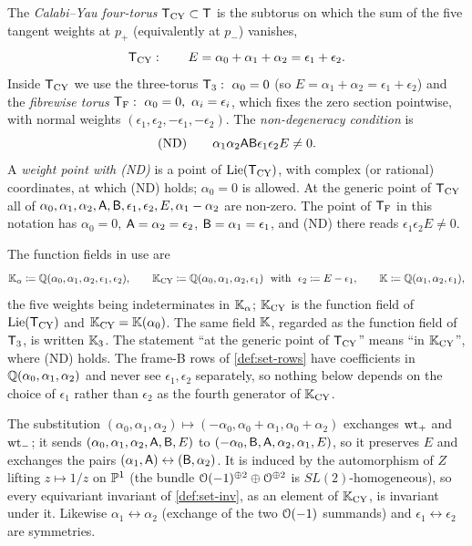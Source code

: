 \begin{defn}
\label{def:set-ND}
The \emph{Calabi--Yau four-torus} $\mathsf{T}_{\mathrm{CY}}\subset\mathsf{T}$ is the subtorus on which the sum of the five tangent weights at $p_+$ (equivalently at $p_-$) vanishes,
\[
\mathsf{T}_{\mathrm{CY}}:\qquad E=\alpha_0+\alpha_1+\alpha_2=\epsilon_1+\epsilon_2 .
\]
Inside $\mathsf{T}_{\mathrm{CY}}$ we use the three-torus $\mathsf{T}_{3}:\ \alpha_0=0$ (so $E=\alpha_1+\alpha_2=\epsilon_1+\epsilon_2$) and the \emph{fibrewise torus} $\TF:\ \alpha_0=0,\ \alpha_i=\epsilon_i$, which fixes the zero section pointwise, with normal weights $(\epsilon_1,\epsilon_2,-\epsilon_1,-\epsilon_2)$. The \emph{non-degeneracy condition} is
\[
\text{(ND)}\qquad \alpha_1\alpha_2\mathsf{A}\mathsf{B}\epsilon_1\epsilon_2E\neq0 .
\]
A \emph{weight point with (ND)} is a point of $\mathrm{Lie}(\mathsf{T}_{\mathrm{CY}})$, with complex (or rational) coordinates, at which (ND) holds; $\alpha_0=0$ is allowed. At the generic point of $\mathsf{T}_{\mathrm{CY}}$ all of $\alpha_0,\alpha_1,\alpha_2,\mathsf{A},\mathsf{B},\epsilon_1,\epsilon_2,E,\alpha_1-\alpha_2$ are non-zero. The point of $\mathsf{T}_{\mathrm{F}}$ in this notation has $\alpha_0=0$, $\mathsf{A}=\alpha_2=\epsilon_2$, $\mathsf{B}=\alpha_1=\epsilon_1$, and (ND) there reads $\epsilon_1\epsilon_2E\neq0$.
\end{defn}

The function fields in use are
\begin{equation}
\label{eq:set-fields}
\Kal\coloneqq\bbQ(\alpha_0,\alpha_1,\alpha_2,\epsilon_1,\epsilon_2),\qquad
\KCY\coloneqq\bbQ(\alpha_0,\alpha_1,\alpha_2,\epsilon_1)\ \text{ with }\ \epsilon_2\coloneqq E-\epsilon_1,\qquad
\Kred\coloneqq\bbQ(\alpha_1,\alpha_2,\epsilon_1),
\end{equation}
the five weights being indeterminates in $\mathbb{K}_{\alpha}$; $\mathbb{K}_{\mathrm{CY}}$ is the function field of $\mathrm{Lie}(\mathsf{T}_{\mathrm{CY}})$ and $\mathbb{K}_{\mathrm{CY}}=\mathbb{K}(\alpha_0)$. The same field $\mathbb{K}$, regarded as the function field of $\mathsf{T}_{3}$, is written $\mathbb{K}_{3}$. The statement ``at the generic point of $\mathsf{T}_{\mathrm{CY}}$'' means ``in $\mathbb{K}_{\mathrm{CY}}$'', where (ND) holds. The frame-B rows of \cref{def:set-rows} have coefficients in $\mathbb{Q}(\alpha_0,\alpha_1,\alpha_2)$ and never see $\epsilon_1,\epsilon_2$ separately, so nothing below depends on the choice of $\epsilon_1$ rather than $\epsilon_2$ as the fourth generator of $\mathbb{K}_{\mathrm{CY}}$.

\begin{lem}
\label{lem:set-sym}
The substitution $(\alpha_0,\alpha_1,\alpha_2)\mapsto(-\alpha_0,\alpha_0+\alpha_1,\alpha_0+\alpha_2)$ exchanges $\mathrm{wt}_+$ and $\mathrm{wt}_-$; it sends $(\alpha_0,\alpha_1,\alpha_2,\mathsf{A},\mathsf{B},E)$ to $(-\alpha_0,\mathsf{B},\mathsf{A},\alpha_2,\alpha_1,E)$, so it preserves $E$ and exchanges the pairs $(\alpha_1,\mathsf{A})\leftrightarrow(\mathsf{B},\alpha_2)$. It is induced by the automorphism of $Z$ lifting $z\mapsto1/z$ on $\mathbb{P}^1$ (the bundle $\mathcal{O}(-1)^{\oplus2}\oplus\mathcal{O}^{\oplus2}$ is $SL(2)$-homogeneous), so every equivariant invariant of \cref{def:set-inv}, as an element of $\mathbb{K}_{\mathrm{CY}}$, is invariant under it. Likewise $\alpha_1\leftrightarrow\alpha_2$ (exchange of the two $\mathcal{O}(-1)$ summands) and $\epsilon_1\leftrightarrow\epsilon_2$ are symmetries.
\end{lem}

